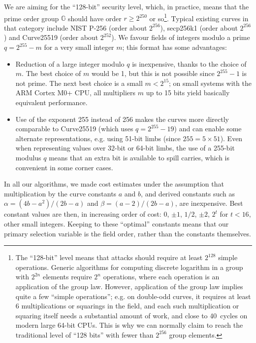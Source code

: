 \documentclass{llncs}
\newcommand{\bG}{\mathbb{G}}
\begin{document}
We are aiming for the ``128-bit'' security level, which, in practice,
means that the prime order group $\bG$ should have order $r \geq
2^{250}$ or so\footnote{The ``128-bit'' level means that attacks should
require at least $2^{128}$ simple operations. Generic algorithms for
computing discrete logarithm in a group with $2^{2n}$ elements require
$2^n$ operations, where each operation is an application of the group
law. However, application of the group law implies quite a few ``simple
operations''; e.g. on double-odd curves, it requires at least 6
multiplications or squarings in the field, and each such multiplication
or squaring itself needs a substantial amount of work, and close to
40~cycles on modern large 64-bit CPUs. This is why we can normally claim
to reach the traditional level of ``128 bits'' with fewer than $2^{256}$
group elements.}. Typical existing curves in that category include NIST
P-256 (order about $2^{256}$), secp256k1 (order about $2^{256}$) and
Curve25519 (order about $2^{252}$). We favour fields of integers modulo
a prime $q = 2^{255} - m$ for a very small integer $m$; this format has
some advantages:
\begin{itemize}

    \item Reduction of a large integer modulo $q$ is inexpensive, thanks
    to the choice of $m$. The best choice of $m$ would be 1, but this is
    not possible since $2^{255}-1$ is not prime. The next best choice is
    a small $m < 2^{15}$; on small systems with the ARM Cortex M0+ CPU,
    all multipliers $m$ up to 15 bits yield basically equivalent
    performance.

    \item Use of the exponent 255 instead of 256 makes the curves more
    directly comparable to Curve25519 (which uses $q = 2^{255}-19$) and
    can enable some alternate representations, e.g. using 51-bit limbs
    (since $255 = 5\times 51$). Even when representing values over
    32-bit or 64-bit limbs, the use of a 255-bit modulus $q$ means that
    an extra bit is available to spill carries, which is convenient in
    some corner cases.

\end{itemize}

In all our algorithms, we made cost estimates under the assumption that
multiplication by the curve constants $a$ and $b$, and derived constants
such as $\alpha = (4b-a^2)/(2b-a)$ and $\beta = (a-2)/(2b-a)$, are
inexpensive. Best constant values are then, in increasing order of cost:
$0$, $\pm 1$, $1/2$, $\pm 2$, $2^t$ for $t < 16$, other small integers.
Keeping to these ``optimal'' constants means that our primary selection
variable is the field order, rather than the constants themselves.
\end{document}
